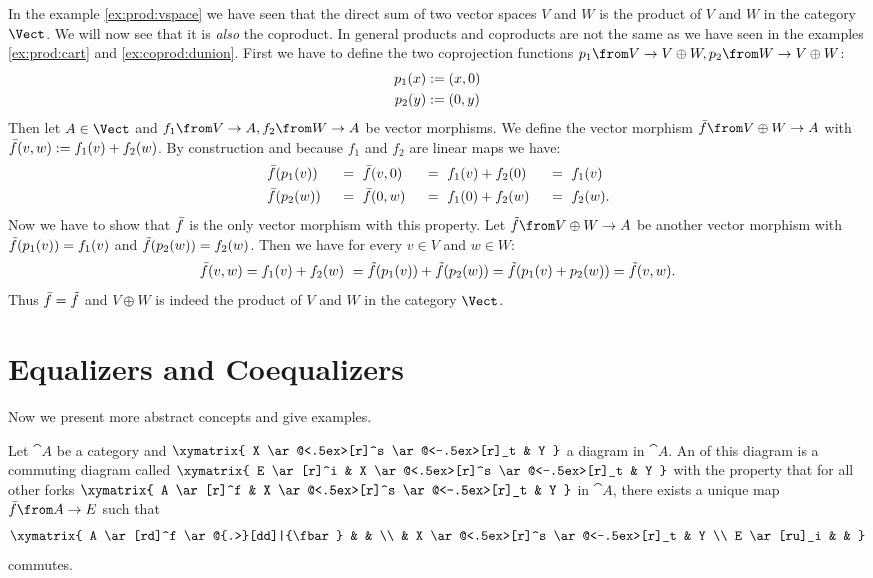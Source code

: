 \begin{example}
  \label{ex:coprod:vspace}
  In the example \ref{ex:prod:vspace} we have seen that the direct sum of two vector spaces $V$ and $W$ is the product of $V$ and $W$ in the category $\Vect$.
  We will now see that it is \emph{also} the coproduct.
  In general products and coproducts are not the same as we have seen in the examples \ref{ex:prod:cart} and \ref{ex:coprod:dunion}.
  First we have to define the two coprojection functions $p_1 \from V \to V \oplus W, p_2 \from W \to V \oplus W$:
  \begin{alignat*}{2}
    p_1(x) &:= \left( x , 0 \right) \\
    p_2(y) &:= \left( 0 , y \right)
  \end{alignat*}
  Then let $A \in \Vect$ and $f_1 \from V \to A, f_2 \from W \to A$ be vector morphisms.
  We define the vector morphism $\fbar \from V \oplus W \to A$ with $\bar{f}(v, w) := f_1(v) + f_2(w)$.
  By construction and because $f_1$ and $f_2$ are linear maps we have:
  \begin{alignat*}{6}
    & \bar{f}(p_1(v)) ~&& =~ \bar{f}(v, 0) ~&&=~ f_1(v) + f_2(0) ~&&=~ f_1(v) \\
    & \bar{f}(p_2(w)) ~&& =~ \bar{f}(0, w) ~&&=~ f_1(0) + f_2(w) ~&&=~ f_2(w) .
  \end{alignat*}
  Now we have to show that $\bar{f}$ is the only vector morphism with this property.
  Let $\ftilde \from V \oplus W \to A$ be another vector morphism with $\tilde{f}(p_1(v)) = f_1(v)$ and $\tilde{f}(p_2(w)) = f_2(w)$.
  Then we have for every $v \in V$ and $w \in W$:
  $$ \bar{f}(v,w) = f_1(v) + f_2(w)\ = \tilde{f}(p_1(v)) + \tilde{f}(p_2(w)) = \tilde{f}(p_1(v) + p_2(w)) = \tilde{f}(v, w). $$
  Thus $\bar{f} = \tilde{f}$ and $V \oplus W$ is indeed the product of $V$ and $W$ in the category $\Vect$.
\end{example}

\section*{Equalizers and Coequalizers}

Now we present more abstract concepts and give examples.

\begin{definition}[Equalizer]
  \label{def:equa}
  Let $\cat{A}$ be a category and
  $ \xymatrix{
    X \ar@<.5ex>[r]^s \ar@<-.5ex>[r]_t & Y
  } $
  a diagram in $\cat{A}$.
  An  of this diagram is a commuting diagram called 
  $ \xymatrix{
    E \ar[r]^i & X \ar@<.5ex>[r]^s \ar@<-.5ex>[r]_t & Y
  } $
  with the property that for all other forks
  $ \xymatrix{
    A \ar[r]^f & X \ar@<.5ex>[r]^s \ar@<-.5ex>[r]_t & Y
  } $
  in $\cat{A}$, there exists a unique map $\fbar\from A \to E$ such that
  \[ \xymatrix{
    A \ar[rd]^f \ar@{.>}[dd]|{\fbar} & & \\
    & X \ar@<.5ex>[r]^s \ar@<-.5ex>[r]_t & Y \\
    E \ar[ru]_i & &
  } \]
  commutes.
\end{definition}

